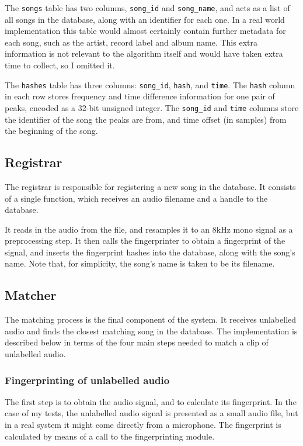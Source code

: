 \documentclass[12pt,a4paper,twoside,openright]{report}
\begin{document}
The \lstinline{songs} table has two columns, \lstinline{song_id} and \lstinline{song_name}, and acts as a list of all songs in the database, along with an identifier for each one. In a real world implementation this table would almost certainly contain further metadata for each song, such as the artist, record label and album name. This extra information is not relevant to the algorithm itself and would have taken extra time to collect, so I omitted it.

The \lstinline{hashes} table has three columns: \lstinline{song_id}, \lstinline{hash}, and \lstinline{time}. The \lstinline{hash} column in each row stores frequency and time difference information for one pair of peaks, encoded as a 32-bit unsigned integer. The \lstinline{song_id} and \lstinline{time} columns store the identifier of the song the peaks are from, and time offset (in samples) from the beginning of the song.


\subsection{Registrar}
\label{shazam:registrar}

The registrar is responsible for registering a new song in the database. It consists of a single function, which receives an audio filename and a handle to the database. 

It reads in the audio from the file, and resamples it to an 8kHz mono signal as a preprocessing step. It then calls the fingerprinter to obtain a fingerprint of the signal, and inserts the fingerprint hashes into the database, along with the song's name. Note that, for simplicity, the song's name is taken to be its filename.


\subsection{Matcher}
\label{shazam:matcher}

The matching process is the final component of the system. It receives unlabelled audio and finds the closest matching song in the database. The implementation is described below in terms of the four main steps needed to match a clip of unlabelled audio.

\subsubsection{Fingerprinting of unlabelled audio}

The first step is to obtain the audio signal, and to calculate its fingerprint. In the case of my tests, the unlabelled audio signal is presented as a small audio file, but in a real system it might come directly from a microphone. The fingerprint is calculated by means of a call to the fingerprinting module.
\end{document}
